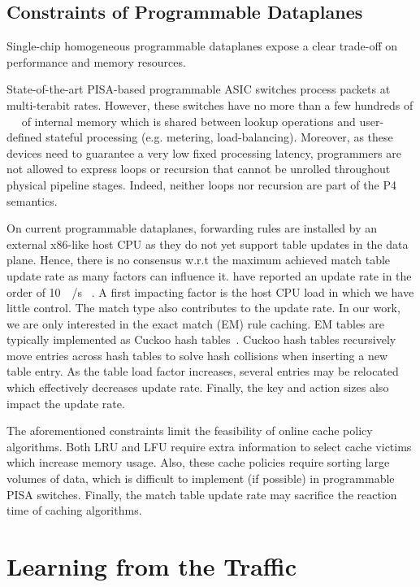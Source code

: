 \subsection{Constraints of Programmable Dataplanes}\label{sec:constraints}

Single-chip homogeneous programmable dataplanes expose a clear trade-off on performance and memory resources.

State-of-the-art PISA-based programmable ASIC switches process packets at multi-terabit rates.
However, these switches have no more than a few hundreds of \SI{}{\mega\byte} of internal memory which is shared between lookup operations and user-defined stateful processing (e.g. metering, load-balancing).
Moreover, as these devices need to guarantee a very low fixed processing latency, programmers are not allowed to express loops or recursion that cannot be unrolled throughout physical pipeline stages.
Indeed, neither loops nor recursion are part of the P4 semantics.

On current programmable dataplanes, forwarding rules are installed by an external x86-like host CPU as they do not yet support table updates in the data plane.
Hence, there is no consensus w.r.t the maximum achieved match table update rate as many factors can influence it.
\citeauthor{Jin:2017} have reported an update rate in the order of \SI{10}{\kilo\update/\second}
~\cite{Jin:2017}.
A first impacting factor is the host CPU load in which we have little control.
The match type also contributes to the update rate.
In our work, we are only interested in the exact match (EM) rule caching. 
EM tables are typically implemented as Cuckoo hash tables~\cite{Kirsch:2009,Bosshart:14}.
Cuckoo hash tables recursively move entries across hash tables to solve hash collisions when inserting a new table entry.
As the table load factor increases, several entries may be relocated which effectively decreases update rate.
Finally, the key and action sizes also impact the update rate.

The aforementioned constraints limit the feasibility of online cache policy algorithms.
Both LRU and LFU require extra information to select cache victims which increase memory usage.
Also, these cache policies require sorting large volumes of data, which is difficult to implement (if possible) in programmable PISA switches.
Finally, the match table update rate may sacrifice the reaction time of caching algorithms.

\section{Learning from the Traffic}\label{sec:traffic}

